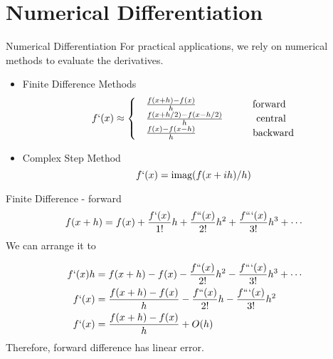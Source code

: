 \documentclass{beamer}
\begin{document}
\section{Numerical Differentiation}
\begin{frame}{Numerical Differentiation}
For practical applications, we rely on numerical methods to evaluate the derivatives.

\begin{itemize}
     \item Finite Difference Methods
     \begin{equation*}
         f`(x) \approx
    \begin{cases}
         & \frac{f(x+h)-f(x)}{h} ~~~~~~~~~~~~~~~~~\textrm{forward} \\
         & \frac{f(x+h/2)-f(x-h/2)}{h} ~~~~~~~~~~\textrm{central}\\
         & \frac{f(x)-f(x-h)}{h} ~~~~~~~~~~~~~~~~~\textrm{backward}    
     \end{cases}
     \end{equation*}
     \item Complex Step Method
     \begin{equation*}
         f`(x) = \textrm{imag}(f(x+ih)/h)
     \end{equation*}
\end{itemize}
\end{frame}

\begin{frame}{Finite Difference - forward}
\begin{equation*}
    f(x+h) = f(x) + \frac{f`(x)}{1!}h + \frac{f``(x)}{2!}h^2 + \frac{f```(x)}{3!}h^3 + \cdots 
\end{equation*}
\pause
We can arrange it to 

\begin{equation*}
\begin{split}
    f`(x)h &= f(x+h) - f(x) - \frac{f``(x)}{2!}h^2  - \frac{f```(x)}{3!}h^3 + \cdots \\
    f`(x) &= \frac{f(x+h) - f(x)}{h} - \frac{f``(x)}{2!}h  - \frac{f```(x)}{3!}h^2 \\
    f`(x) &= \frac{f(x+h) - f(x)}{h} + O(h)       
\end{split}
\end{equation*}
Therefore, forward difference has linear error.
\end{frame}
\end{document}
